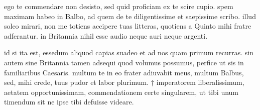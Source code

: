 


 ego te commendare non desisto, sed quid proficiam ex te scire cupio. spem maximam habeo in Balbo, ad quem de te diligentissime et saepissime scribo. illud soleo mirari, non me totiens accipere tuas litteras, quotiens a Quinto mihi fratre adferantur. in Britannia nihil esse audio neque auri neque argenti.

 id si ita est, essedum aliquod capias suadeo et ad nos quam primum recurras. sin autem sine Britannia tamen adsequi quod volumus possumus, perfice ut sis in familiaribus Caesaris. multum te in eo frater adiuvabit meus, multum Balbus, sed, mihi crede, tuus pudor et labor plurimum. † imperatorem liberalissimum, aetatem opportunissimam, commendationem certe singularem, ut tibi unum timendum sit ne ipse tibi defuisse videare.
